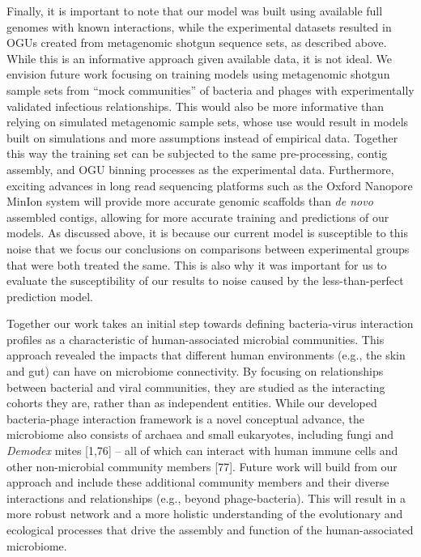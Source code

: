 \documentclass[12pt,]{article}
\begin{document}
Finally, it is important to note that our model was built using
available full genomes with known interactions, while the experimental
datasets resulted in OGUs created from metagenomic shotgun sequence
sets, as described above. While this is an informative approach given
available data, it is not ideal. We envision future work focusing on
training models using metagenomic shotgun sample sets from ``mock
communities'' of bacteria and phages with experimentally validated
infectious relationships. This would also be more informative than
relying on simulated metagenomic sample sets, whose use would result in
models built on simulations and more assumptions instead of empirical
data. Together this way the training set can be subjected to the same
pre-processing, contig assembly, and OGU binning processes as the
experimental data. Furthermore, exciting advances in long read
sequencing platforms such as the Oxford Nanopore MinIon system will
provide more accurate genomic scaffolds than \emph{de novo} assembled
contigs, allowing for more accurate training and predictions of our
models. As discussed above, it is because our current model is
susceptible to this noise that we focus our conclusions on comparisons
between experimental groups that were both treated the same. This is
also why it was important for us to evaluate the susceptibility of our
results to noise caused by the less-than-perfect prediction model.

Together our work takes an initial step towards defining bacteria-virus
interaction profiles as a characteristic of human-associated microbial
communities. This approach revealed the impacts that different human
environments (e.g., the skin and gut) can have on microbiome
connectivity. By focusing on relationships between bacterial and viral
communities, they are studied as the interacting cohorts they are,
rather than as independent entities. While our developed bacteria-phage
interaction framework is a novel conceptual advance, the microbiome also
consists of archaea and small eukaryotes, including fungi and
\emph{Demodex} mites {[}1,76{]} -- all of which can interact with human
immune cells and other non-microbial community members {[}77{]}. Future
work will build from our approach and include these additional community
members and their diverse interactions and relationships (e.g., beyond
phage-bacteria). This will result in a more robust network and a more
holistic understanding of the evolutionary and ecological processes that
drive the assembly and function of the human-associated microbiome.
\end{document}
